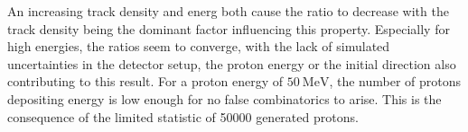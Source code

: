An increasing track density and energ both cause the ratio to decrease with the track density being the dominant factor influencing this property. Especially for high energies,
the ratios seem to converge, with the lack of simulated uncertainties in the detector setup, the proton energy or the initial direction also contributing to this result.
For a proton energy of $\SI{50}{\mega\eV}$, the number of protons depositing energy is low enough for no false combinatorics to arise. This is the consequence of the
limited statistic of 50000 generated protons.
